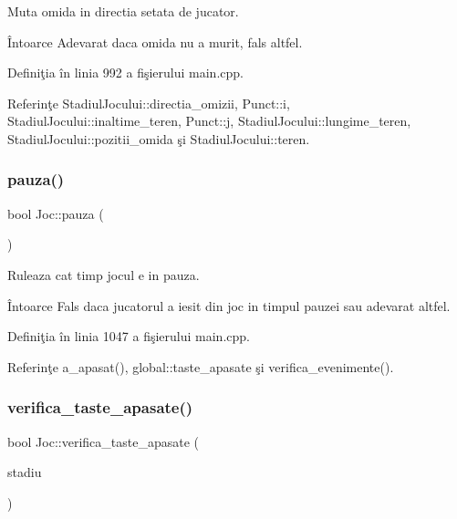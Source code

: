 Muta omida in directia setata de jucator.

\begin{DoxyReturn}{Întoarce}
Adevarat daca omida nu a murit, fals altfel. 
\end{DoxyReturn}


Definiţia în linia 992 a fişierului main.\+cpp.



Referinţe Stadiul\+Jocului\+::directia\+\_\+omizii, Punct\+::i, Stadiul\+Jocului\+::inaltime\+\_\+teren, Punct\+::j, Stadiul\+Jocului\+::lungime\+\_\+teren, Stadiul\+Jocului\+::pozitii\+\_\+omida şi Stadiul\+Jocului\+::teren.

\mbox{\label{classJoc_a0f90008558e8cbed6537b542f79ae55b}} 
\subsubsection{\texorpdfstring{pauza()}{pauza()}}
{\footnotesize\ttfamily bool Joc\+::pauza (\begin{DoxyParamCaption}\item[{\hyperlink{classStadiulJocului}{Stadiul\+Jocului} \&}]{ }\end{DoxyParamCaption})\hspace{0.3cm}{\ttfamily [private]}}

Ruleaza cat timp jocul e in pauza.

\begin{DoxyReturn}{Întoarce}
Fals daca jucatorul a iesit din joc in timpul pauzei sau adevarat altfel. 
\end{DoxyReturn}


Definiţia în linia 1047 a fişierului main.\+cpp.



Referinţe a\+\_\+apasat(), global\+::taste\+\_\+apasate şi verifica\+\_\+evenimente().

\mbox{\label{classJoc_afe57540f76b33492c721c14726a89d86}} 
\subsubsection{\texorpdfstring{verifica\+\_\+taste\+\_\+apasate()}{verifica\_taste\_apasate()}}
{\footnotesize\ttfamily bool Joc\+::verifica\+\_\+taste\+\_\+apasate (\begin{DoxyParamCaption}\item[{\hyperlink{classStadiulJocului}{Stadiul\+Jocului} \&}]{stadiu }\end{DoxyParamCaption})\hspace{0.3cm}{\ttfamily [private]}}



